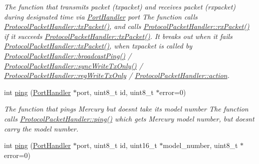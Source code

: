 \begin{DoxyCompactItemize}
\begin{DoxyCompactList}\small\item\em The function that transmits packet (txpacket) and receives packet (rxpacket) during designated time via \hyperlink{classmercury_1_1_port_handler}{Port\+Handler} port  The function calls \hyperlink{classmercury_1_1_protocol_packet_handler_a245f01395d9684bc58788e8a06de3ffc}{Protocol\+Packet\+Handler\+::tx\+Packet()},  and calls \hyperlink{classmercury_1_1_protocol_packet_handler_a4d124ca43f6a2178497eaaabb9e5907b}{Protocol\+Packet\+Handler\+::rx\+Packet()} if it succeeds \hyperlink{classmercury_1_1_protocol_packet_handler_a245f01395d9684bc58788e8a06de3ffc}{Protocol\+Packet\+Handler\+::tx\+Packet()}.  It breaks out  when it fails \hyperlink{classmercury_1_1_protocol_packet_handler_a245f01395d9684bc58788e8a06de3ffc}{Protocol\+Packet\+Handler\+::tx\+Packet()},  when txpacket is called by \hyperlink{classmercury_1_1_protocol_packet_handler_a3cbeb97b8a4a955180a54255a0931d2d}{Protocol\+Packet\+Handler\+::broadcast\+Ping()} / \hyperlink{classmercury_1_1_protocol_packet_handler_a4a08a338c48d6c9ef42183ca74297dce}{Protocol\+Packet\+Handler\+::sync\+Write\+Tx\+Only()} / \hyperlink{classmercury_1_1_protocol_packet_handler_af43e9f53d3e295b12b69f4b99c8c1746}{Protocol\+Packet\+Handler\+::reg\+Write\+Tx\+Only} / \hyperlink{classmercury_1_1_protocol_packet_handler_a55034471e726b363c0a535acb1012468}{Protocol\+Packet\+Handler\+::action}. \end{DoxyCompactList}\item 
int \hyperlink{classmercury_1_1_protocol_packet_handler_a6a34fbd6bd9cbcedf87e5c8341be7ca0}{ping} (\hyperlink{classmercury_1_1_port_handler}{Port\+Handler} $\ast$port, uint8\+\_\+t id, uint8\+\_\+t $\ast$error=0)
\begin{DoxyCompactList}\small\item\em The function that pings Mercury but doesn\textquotesingle{}t take its model number  The function calls \hyperlink{classmercury_1_1_protocol_packet_handler_a6a34fbd6bd9cbcedf87e5c8341be7ca0}{Protocol\+Packet\+Handler\+::ping()} which gets Mercury model number,  but doesn\textquotesingle{}t carry the model number. \end{DoxyCompactList}\item 
int \hyperlink{classmercury_1_1_protocol_packet_handler_a5096f7bcb97faf46ed7b363c509283a6}{ping} (\hyperlink{classmercury_1_1_port_handler}{Port\+Handler} $\ast$port, uint8\+\_\+t id, uint16\+\_\+t $\ast$model\+\_\+number, uint8\+\_\+t $\ast$error=0)

\end{DoxyCompactItemize}
